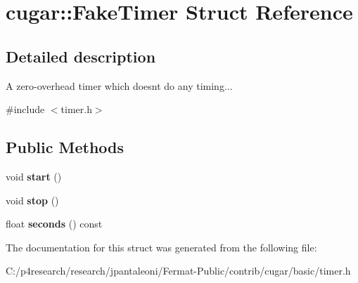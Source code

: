 \hypertarget{structcugar_1_1_fake_timer}{}\section{cugar\+:\+:Fake\+Timer Struct Reference}
\label{structcugar_1_1_fake_timer}


\subsection{Detailed description}
A zero-\/overhead timer which doesn\textquotesingle{}t do any timing... 

{\ttfamily \#include $<$timer.\+h$>$}

\subsection*{Public Methods}
\begin{DoxyCompactItemize}
\item 
\mbox{\label{structcugar_1_1_fake_timer_a3a0ca12091e98712862c1a35aef06015}} 
void {\bfseries start} ()
\item 
\mbox{\label{structcugar_1_1_fake_timer_ac7094f08423256311f7aa7f1619cf498}} 
void {\bfseries stop} ()
\item 
\mbox{\label{structcugar_1_1_fake_timer_af42040609903f481b4553e2c7a69cdd2}} 
float {\bfseries seconds} () const
\end{DoxyCompactItemize}


The documentation for this struct was generated from the following file\+:\begin{DoxyCompactItemize}
\item 
C\+:/p4research/research/jpantaleoni/\+Fermat-\/\+Public/contrib/cugar/basic/timer.\+h\end{DoxyCompactItemize}
